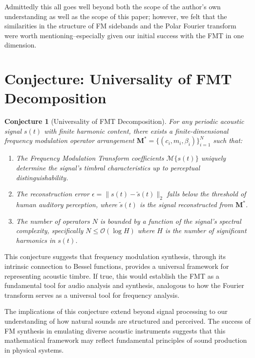 \documentclass[11pt,twoside]{report}
\newtheorem*{conj}{Conjecture}
\numberwithin{thm}{section}
\numberwithin{equation}{section}
\begin{document}
Admittedly this all goes well beyond both the scope of the author's own understanding as well as the scope of this paper; however, we felt that the similarities in the structure of FM sidebands and the Polar Fourier transform were worth mentioning--especially given our initial success with the FMT in one dimension. 
\clearpage
\section{Conjecture: Universality of FMT Decomposition}
\begin{conj}[Universality of FMT Decomposition]\label{conj:universality}
For any periodic acoustic signal $s(t)$ with finite harmonic content, there exists a finite-dimensional frequency modulation operator arrangement $\mathbf{M}^* = \{(c_i, m_i, \beta_i)\}_{i=1}^N$ such that:
\begin{enumerate}
    \item The Frequency Modulation Transform coefficients $\mathcal{M}\{s(t)\}$ uniquely determine the signal's timbral characteristics up to perceptual distinguishability.
    
    \item The reconstruction error $\epsilon = \|s(t) - \tilde{s}(t)\|_2$ falls below the threshold of human auditory perception, where $\tilde{s}(t)$ is the signal reconstructed from $\mathbf{M}^*$.
    
    \item The number of operators $N$ is bounded by a function of the signal's spectral complexity, specifically $N \leq \mathcal{O}(\log H)$ where $H$ is the number of significant harmonics in $s(t)$.
\end{enumerate}
\end{conj}

This conjecture suggests that frequency modulation synthesis, through its intrinsic connection to Bessel functions, provides a universal framework for representing acoustic timbre. If true, this would establish the FMT as a fundamental tool for audio analysis and synthesis, analogous to how the Fourier transform serves as a universal tool for frequency analysis.

The implications of this conjecture extend beyond signal processing to our understanding of how natural sounds are structured and perceived. The success of FM synthesis in emulating diverse acoustic instruments suggests that this mathematical framework may reflect fundamental principles of sound production in physical systems.
\end{document}
